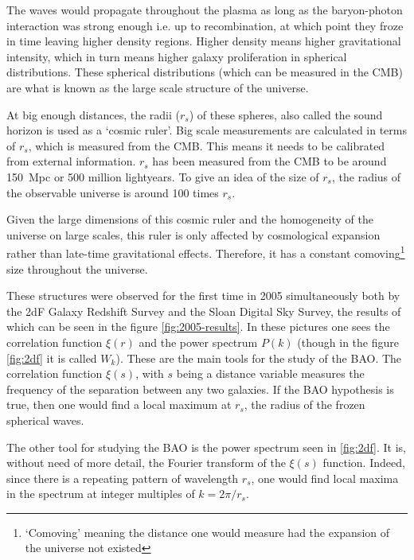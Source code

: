 The waves would propagate throughout the plasma as long as the baryon-photon interaction was strong enough i.e. up to recombination, at which point they froze in time leaving higher density regions. Higher density means higher gravitational intensity, which in turn means higher galaxy proliferation in spherical distributions. These spherical distributions (which can be measured in the CMB) are what is known as the large scale structure of the universe.

At big enough distances, the radii ($r_s$) of these spheres, also called the sound horizon is used as a `cosmic ruler'. Big scale measurements are calculated in terms of $r_s$, which is measured from the CMB. This means it needs to be calibrated from external information. $ r_s$ has been measured from the CMB to be around  \SI{150}{Mpc} or 500 million lightyears.
To give an idea of the size of $r_s$, the radius of the observable universe is around 100 times $r_s$.

Given the large dimensions of this cosmic ruler and the homogeneity of the universe on large scales, this ruler is only affected by cosmological expansion rather than late-time gravitational effects. Therefore, it has a constant comoving\footnote{`Comoving' meaning the distance one would measure had the expansion of the universe not existed} size throughout the universe.

These structures were observed for the first time in 2005 simultaneously both by the 2dF Galaxy Redshift Survey\cite{2dFCole2005} and the Sloan Digital Sky Survey\cite{Eisenstein2005}, the results of which can be seen in the figure \ref{fig:2005-results}. In these pictures one sees the correlation function  $\xi(r)$ and the power spectrum $P(k)$ (though in the figure \ref{fig:2df} it is called $W_k$). These are the main tools for the study of the BAO.
The correlation function $\xi(s)$, with $s$ being a distance variable measures the frequency of the separation between any two galaxies. If the BAO hypothesis is true, then one would find a local maximum at $r_s$, the radius of the frozen spherical waves.

The other tool for studying the BAO is the power spectrum seen in \ref{fig:2df}. It is, without need of more detail, the Fourier transform of the $\xi(s)$ function. Indeed, since there is a repeating pattern of wavelength $r_s$, one would find local maxima in the spectrum at integer multiples of $k = 2\pi /r_s$.

